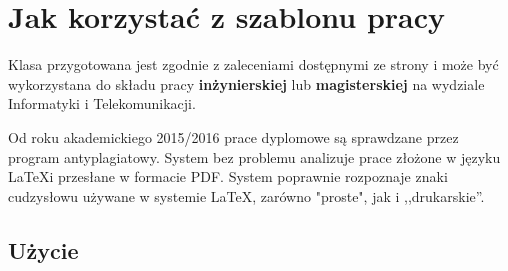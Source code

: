 
\chapter{Jak korzystać z szablonu pracy}

Klasa przygotowana jest zgodnie z zaleceniami dostępnymi ze strony \url{} i może być wykorzystana do składu pracy \textbf{inżynierskiej} lub \textbf{magisterskiej} na wydziale Informatyki i Telekomunikacji.


Od roku akademickiego 2015/2016 prace dyplomowe są sprawdzane przez program antyplagiatowy. System bez problemu analizuje prace złożone w języku \LaTeX i przesłane w formacie PDF. System poprawnie rozpoznaje znaki cudzysłowu używane w systemie \LaTeX, zarówno "proste", jak i ,,drukarskie''.

\section{Użycie}

